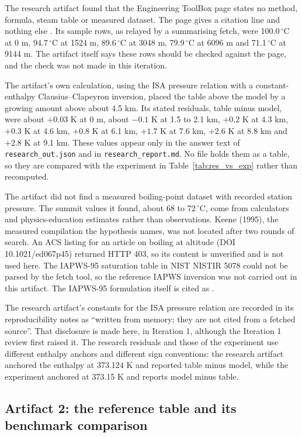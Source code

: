 \documentclass[11pt,letterpaper]{article}
\begin{document}
The research artifact found that the Engineering ToolBox page states no method, formula, steam table or measured dataset. The page gives a citation line and nothing else \cite{ref1}. Its sample rows, as relayed by a summarising fetch, were 100.0\,$^\circ$C at 0 m, 94.7\,$^\circ$C at 1524 m, 89.6\,$^\circ$C at 3048 m, 79.9\,$^\circ$C at 6096 m and 71.1\,$^\circ$C at 9144 m. The artifact itself says these rows should be checked against the page, and the check was not made in this iteration.

The artifact's own calculation, using the ISA pressure relation with a constant-enthalpy Clausius--Clapeyron inversion, placed the table above the model by a growing amount above about 4.5 km. Its stated residuals, table minus model, were about $+0.03$ K at 0 m, about $-0.1$ K at 1.5 to 2.1 km, $+0.2$ K at 4.3 km, $+0.3$ K at 4.6 km, $+0.8$ K at 6.1 km, $+1.7$ K at 7.6 km, $+2.6$ K at 8.8 km and $+2.8$ K at 9.1 km. These values appear only in the answer text of \texttt{research\_out.json} and in \texttt{research\_report.md}. No file holds them as a table, so they are compared with the experiment in Table~\ref{tab:res_vs_exp} rather than recomputed.

The artifact did not find a measured boiling-point dataset with recorded station pressure. The summit values it found, about 68 to 72\,$^\circ$C, come from calculators and physics-education estimates rather than observations. Keene (1995), the measured compilation the hypothesis names, was not located after two rounds of search. An ACS listing for an article on boiling at altitude (DOI 10.1021/ed067p45) returned HTTP 403, so its content is unverified and is not used here. The IAPWS-95 saturation table in NIST NISTIR 5078 could not be parsed by the fetch tool, so the reference IAPWS inversion was not carried out in this artifact. The IAPWS-95 formulation itself is cited as \cite{ref2}.

The research artifact's constants for the ISA pressure relation are recorded in its reproducibility notes as ``written from memory; they are not cited from a fetched source''. That disclosure is made here, in Iteration 1, although the Iteration 1 review first raised it. The research residuals and those of the experiment use different enthalpy anchors and different sign conventions: the research artifact anchored the enthalpy at 373.124 K and reported table minus model, while the experiment anchored at 373.15 K and reports model minus table.

\subsection{Artifact 2: the reference table and its benchmark comparison}
\end{document}
